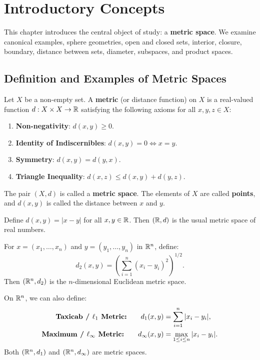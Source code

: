 \chapter{Introductory Concepts}
\label{chap:introductory_concepts}

This chapter introduces the central object of study: a \textbf{metric space}. We examine canonical examples, sphere geometries, open and closed sets, interior, closure, boundary, distance between sets, diameter, subspaces, and product spaces.

\section{Definition and Examples of Metric Spaces}
\label{sec:metric_space_def}

\begin{definition}
Let $X$ be a non-empty set. A \textbf{metric} (or distance function) on $X$ is a real-valued function $d: X \times X \to \mathbb{R}$ satisfying the following axioms for all $x, y, z \in X$:
\begin{enumerate}[label=\rm{(M\arabic*)}]
    \item \textbf{Non-negativity}: $d(x,y) \ge 0$.
    \item \textbf{Identity of Indiscernibles}: $d(x,y) = 0 \iff x = y$.
    \item \textbf{Symmetry}: $d(x,y) = d(y,x)$.
    \item \textbf{Triangle Inequality}: $d(x,z) \le d(x,y) + d(y,z)$.
\end{enumerate}
The pair $(X,d)$ is called a \textbf{metric space}. The elements of $X$ are called \textbf{points}, and $d(x,y)$ is called the distance between $x$ and $y$.
\end{definition}

\begin{example}
Define $d(x,y) = |x-y|$ for all $x,y \in \mathbb{R}$. Then $(\mathbb{R}, d)$ is the usual metric space of real numbers.
\end{example}

\begin{example}
For $x = (x_1, \dots, x_n)$ and $y = (y_1, \dots, y_n)$ in $\mathbb{R}^n$, define:
\[
d_2(x,y) = \left( \sum_{i=1}^n (x_i - y_i)^2 \right)^{1/2}.
\]
Then $(\mathbb{R}^n, d_2)$ is the $n$-dimensional Euclidean metric space.
\end{example}

\begin{example}
On $\mathbb{R}^n$, we can also define:
\begin{align*}
\text{\textbf{Taxicab / $\ell_1$ Metric:}} \qquad d_1(x,y) &= \sum_{i=1}^n |x_i - y_i|, \\
\text{\textbf{Maximum / $\ell_\infty$ Metric:}} \qquad d_\infty(x,y) &= \max_{1 \le i \le n} |x_i - y_i|.
\end{align*}
Both $(\mathbb{R}^n, d_1)$ and $(\mathbb{R}^n, d_\infty)$ are metric spaces.
\end{example}

